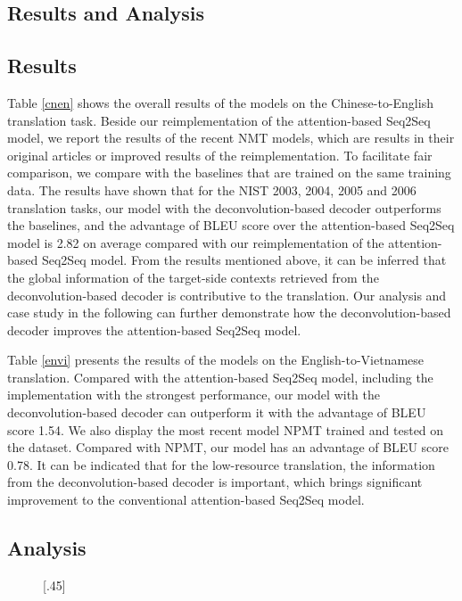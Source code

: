 \documentclass[11pt]{article}
\begin{document}
\begin{CJK}{UTF8}{gbsn}
\section{Results and Analysis}
\subsection{Results}
Table \ref{cnen} shows the overall results of the models on the Chinese-to-English translation task. Beside our reimplementation of the attention-based Seq2Seq model, we report the results of the recent NMT models, which are results in their original articles or improved results of the reimplementation. To facilitate fair comparison, we compare with the baselines that are trained on the same training data. The results have shown that for the NIST 2003, 2004, 2005 and 2006 translation tasks, our model with the deconvolution-based decoder outperforms the baselines, and the advantage of BLEU score over the attention-based Seq2Seq model is 2.82 on average compared with our reimplementation of the attention-based Seq2Seq model. From the results mentioned above, it can be inferred that the global information of the target-side contexts retrieved from the deconvolution-based decoder is contributive to the translation. Our analysis and case study in the following can further demonstrate how the deconvolution-based decoder improves the attention-based Seq2Seq model.

Table \ref{envi} presents the results of the models on the English-to-Vietnamese translation. Compared with the attention-based Seq2Seq model, including the implementation with the strongest performance, our model with the deconvolution-based decoder can outperform it with the advantage of BLEU score 1.54. We also display the most recent model NPMT \citep{nplm} trained and tested on the dataset. Compared with NPMT, our model has an advantage of BLEU score 0.78. It can be indicated that for the low-resource translation, the information from the deconvolution-based decoder is important, which brings significant improvement to the conventional attention-based Seq2Seq model.

\subsection{Analysis}
\begin{figure}[tb]
\captionsetup[subfigure]{font=footnotesize}
\centering
{}[.45\textwidth]{}
\end{figure}
\end{CJK}
\end{document}
